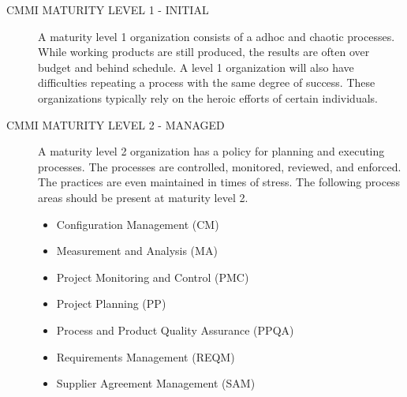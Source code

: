 \documentclass[SDSUThesis.tex]{subfiles}
\begin{document}
    \begin{description}
        \item[CMMI MATURITY LEVEL 1 - INITIAL]
            A maturity level 1 organization consists of a adhoc and chaotic processes.  While working
            products are still produced, the results are often over budget and behind schedule.  A level
            1 organization will also have difficulties repeating a process with the same degree of 
            success.  These organizations typically rely on the heroic efforts of certain individuals. 
            
        \item[CMMI MATURITY LEVEL 2 - MANAGED]
            A maturity level 2 organization has a policy for planning and executing processes.  
            The processes are controlled, monitored, reviewed, and enforced.  The practices are even
            maintained in times of stress.  The following process areas should be present at maturity
            level 2.
            \begin{itemize}
                \item Configuration Management (CM)
                \item Measurement and Analysis (MA)
                \item Project Monitoring and Control (PMC)
                \item Project Planning (PP)
                \item Process and Product Quality Assurance (PPQA)
                \item Requirements Management (REQM)
                \item Supplier Agreement Management (SAM)
            \end{itemize}


\end{description}
\end{document}
